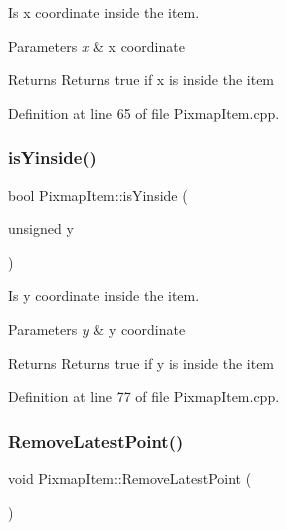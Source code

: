 Is x coordinate inside the item. 


\begin{DoxyParams}{Parameters}
{\em x} & x coordinate \\
\hline
\end{DoxyParams}
\begin{DoxyReturn}{Returns}
Returns true if x is inside the item 
\end{DoxyReturn}


Definition at line 65 of file Pixmap\+Item.\+cpp.

\mbox{\label{classPixmapItem_ab6e6526fd5cd0ce5ba34b665adca6c5c}} 
\subsubsection{\texorpdfstring{is\+Yinside()}{isYinside()}}
{\footnotesize\ttfamily bool Pixmap\+Item\+::is\+Yinside (\begin{DoxyParamCaption}\item[{unsigned}]{y }\end{DoxyParamCaption})}



Is y coordinate inside the item. 


\begin{DoxyParams}{Parameters}
{\em y} & y coordinate \\
\hline
\end{DoxyParams}
\begin{DoxyReturn}{Returns}
Returns true if y is inside the item 
\end{DoxyReturn}


Definition at line 77 of file Pixmap\+Item.\+cpp.

\mbox{\label{classPixmapItem_ae2e67a7b69ef10dc613e14c1d3c1a327}} 
\subsubsection{\texorpdfstring{Remove\+Latest\+Point()}{RemoveLatestPoint()}}
{\footnotesize\ttfamily void Pixmap\+Item\+::\+Remove\+Latest\+Point (\begin{DoxyParamCaption}{ }\end{DoxyParamCaption})}



